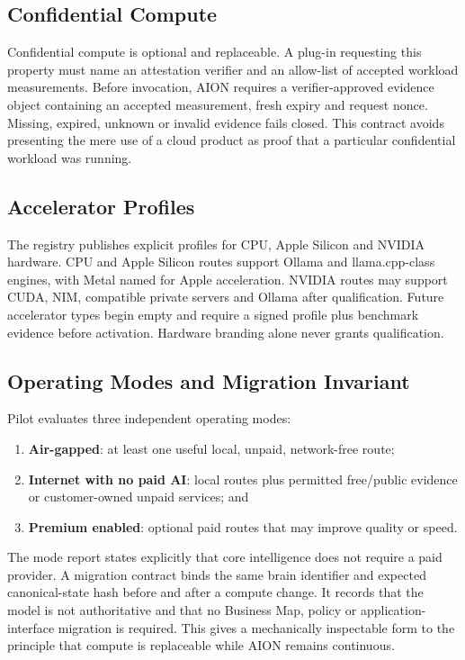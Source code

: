 \subsection{Confidential Compute}

Confidential compute is optional and replaceable.  A plug-in requesting this property must
name an attestation verifier and an allow-list of accepted workload measurements.  Before
invocation, AION requires a verifier-approved evidence object containing an accepted
measurement, fresh expiry and request nonce.  Missing, expired, unknown or invalid evidence
fails closed.  This contract avoids presenting the mere use of a cloud product as proof
that a particular confidential workload was running.

\subsection{Accelerator Profiles}

The registry publishes explicit profiles for CPU, Apple Silicon and NVIDIA hardware.
CPU and Apple Silicon routes support Ollama and llama.cpp-class engines, with Metal named
for Apple acceleration.  NVIDIA routes may support CUDA, NIM, compatible private servers
and Ollama after qualification.  Future accelerator types begin empty and require a signed
profile plus benchmark evidence before activation.  Hardware branding alone never grants
qualification.

\subsection{Operating Modes and Migration Invariant}

Pilot evaluates three independent operating modes:
\begin{enumerate}
  \item \textbf{Air-gapped}: at least one useful local, unpaid, network-free route;
  \item \textbf{Internet with no paid AI}: local routes plus permitted free/public
        evidence or customer-owned unpaid services; and
  \item \textbf{Premium enabled}: optional paid routes that may improve quality or speed.
\end{enumerate}

The mode report states explicitly that core intelligence does not require a paid provider.
A migration contract binds the same brain identifier and expected canonical-state hash
before and after a compute change.  It records that the model is not authoritative and
that no Business Map, policy or application-interface migration is required.  This gives
a mechanically inspectable form to the principle that compute is replaceable while AION
remains continuous.

